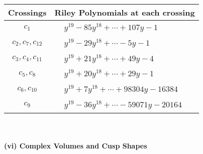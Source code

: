 \documentclass[1p]{elsarticle_modified}
\theoremstyle{definition}
\begin{document}
\begin{tabular}{m{50pt}|m{274pt}}
Crossings & \hspace{64pt}Riley Polynomials at each crossing \\
\hline $$\begin{aligned}c_{1}\end{aligned}$$&$\begin{aligned}
&y^{19}-85 y^{18}+\cdots+107 y-1
\end{aligned}$\\
\hline $$\begin{aligned}c_{2},c_{7},c_{12}\end{aligned}$$&$\begin{aligned}
&y^{19}-29 y^{18}+\cdots-5 y-1
\end{aligned}$\\
\hline $$\begin{aligned}c_{3},c_{4},c_{11}\end{aligned}$$&$\begin{aligned}
&y^{19}+21 y^{18}+\cdots+49 y-4
\end{aligned}$\\
\hline $$\begin{aligned}c_{5},c_{8}\end{aligned}$$&$\begin{aligned}
&y^{19}+20 y^{18}+\cdots+29 y-1
\end{aligned}$\\
\hline $$\begin{aligned}c_{6},c_{10}\end{aligned}$$&$\begin{aligned}
&y^{19}+7 y^{18}+\cdots+98304 y-16384
\end{aligned}$\\
\hline $$\begin{aligned}c_{9}\end{aligned}$$&$\begin{aligned}
&y^{19}-36 y^{18}+\cdots-59071 y-20164
\end{aligned}$\\
\hline
\end{tabular}\\~\\
\newpage\flushleft \textbf{(vi) Complex Volumes and Cusp Shapes}
\end{document}
